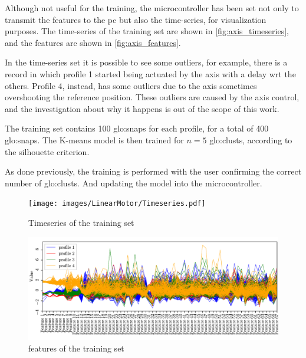 Although not useful for the training, the microcontroller has been set not only to transmit the features to the \gls{pc} but also the time-series, for visualization purposes. The time-series of the training set are shown in \autoref{fig:axis_timeseries}, and the features are shown in \autoref{fig:axis_features}.

In the time-series set it is possible to see some outliers, for example, there is a record in which profile 1 started being actuated by the axis with a delay \gls{wrt} the others. Profile 4, instead, has some outliers due to the axis sometimes overshooting the reference position. These outliers are caused by the axis control, and the investigation about why it happens is out of the scope of this work. 

The training set contains 100 \gls{glo:snap}s for each profile, for a total of 400 \gls{glo:snap}s. The K-means model is then trained for $n=5$ \gls{glo:clust}s, according to the silhouette criterion.

As done previously, the training is performed with the user confirming the correct number of \gls{glo:clust}s. And updating the model into the microcontroller.

\begin{figure}
    \centering
    \texttt{[image: images/LinearMotor/Timeseries.pdf]}
    \caption{Timeseries of the training set}
    \label{fig:axis_timeseries}
\end{figure}


\begin{figure}
    \centering
    \includegraphics[width=\textwidth]{images/LinearMotor/Features.pdf}
    \caption{features of the training set}
    \label{fig:axis_features}
\end{figure}


